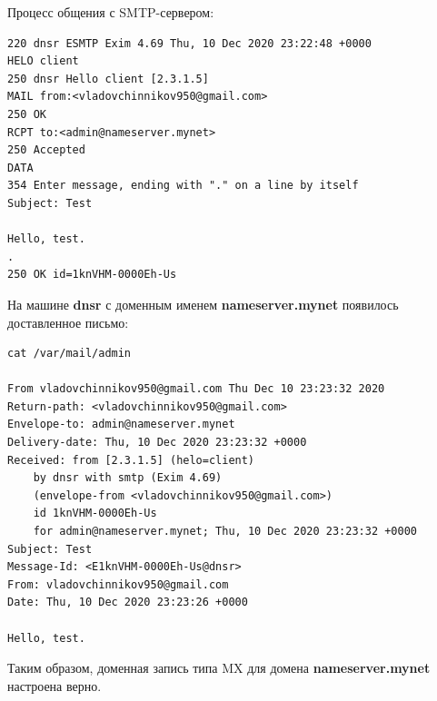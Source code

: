 \documentclass[a4paper,12pt]{article}
\begin{document}
Процесс общения с SMTP-сервером:
\begin{verbatim}
220 dnsr ESMTP Exim 4.69 Thu, 10 Dec 2020 23:22:48 +0000
HELO client
250 dnsr Hello client [2.3.1.5]
MAIL from:<vladovchinnikov950@gmail.com>
250 OK
RCPT to:<admin@nameserver.mynet>
250 Accepted
DATA
354 Enter message, ending with "." on a line by itself
Subject: Test 

Hello, test.
.
250 OK id=1knVHM-0000Eh-Us
\end{verbatim}

На машине \textbf{dnsr} с доменным именем \textbf{nameserver.mynet} появилось доставленное письмо:
\begin{verbatim}
cat /var/mail/admin

From vladovchinnikov950@gmail.com Thu Dec 10 23:23:32 2020
Return-path: <vladovchinnikov950@gmail.com>
Envelope-to: admin@nameserver.mynet
Delivery-date: Thu, 10 Dec 2020 23:23:32 +0000
Received: from [2.3.1.5] (helo=client)
	by dnsr with smtp (Exim 4.69)
	(envelope-from <vladovchinnikov950@gmail.com>)
	id 1knVHM-0000Eh-Us
	for admin@nameserver.mynet; Thu, 10 Dec 2020 23:23:32 +0000
Subject: Test
Message-Id: <E1knVHM-0000Eh-Us@dnsr>
From: vladovchinnikov950@gmail.com
Date: Thu, 10 Dec 2020 23:23:26 +0000

Hello, test.
\end{verbatim}

Таким образом, доменная запись типа MX для домена \textbf{nameserver.mynet} настроена верно.
\end{document}

